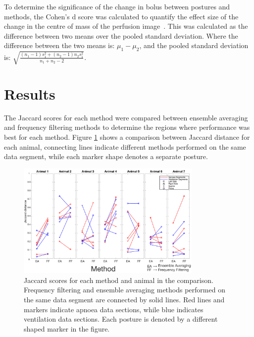 To determine the significance of the change in bolus between postures
and methods, the Cohen's d score was calculated to quantify the effect size of
the change in the centre of mass of the perfusion image~\parencite{Cohen1988}.  
This was calculated as the difference between two means over the pooled standard deviation. 
Where the difference between the two means is: $\mu_1-\mu_2$, and the pooled
standard deviation is: ${\sqrt{\frac{(n_1-1)s^2_1+(n_2-1)n_2s^2_1}{n_1+n_2-2}}}$. 

\section{Results}                         %

The Jaccard scores for each method were compared between 
ensemble averaging and frequency filtering methods to determine the regions where performance 
was best for each method. Figure \ref{fig:resultsJaccard} shows a 
comparison between Jaccard distance for each animal, connecting lines 
indicate different methods performed on the same data segment, while each marker shape
denotes a separate posture.

\begin{figure}
\begin{flushright}
\includegraphics[width=0.8\textwidth]{chapter_2/imgs/fig-resultsJaccard.pdf}
\end{flushright}
\caption[Jaccard index scores]{\label{fig:resultsJaccard}%
Jaccard scores for each method and animal in the comparison. Frequency 
filtering and ensemble averaging methods performed on the same data segment are 
connected by solid lines. Red lines and markers indicate apnoea data sections, 
while blue indicates ventilation data sections. Each posture is denoted by a different
shaped marker in the figure.
}
\end{figure}

